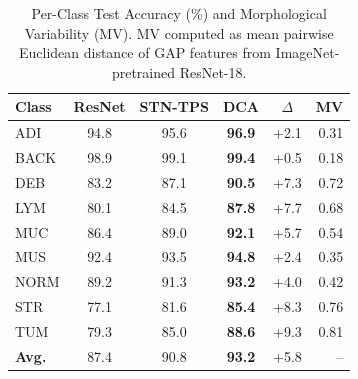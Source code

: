 \begin{table}[t]
\centering
\caption{Per-Class Test Accuracy (\%) and Morphological Variability (MV). MV computed as mean pairwise Euclidean distance of GAP features from ImageNet-pretrained ResNet-18.}
\label{tab:per_class}
\begin{tabularx}{\textwidth}{Xccccr}
\hline
\textbf{Class} & \textbf{ResNet} & \textbf{STN-TPS} & \textbf{DCA} & \textbf{$\Delta$} & \textbf{MV} \\
\hline
ADI & 94.8 & 95.6 & \textbf{96.9} & +2.1 & 0.31 \\
BACK & 98.9 & 99.1 & \textbf{99.4} & +0.5 & 0.18 \\
DEB & 83.2 & 87.1 & \textbf{90.5} & +7.3 & 0.72 \\
LYM & 80.1 & 84.5 & \textbf{87.8} & +7.7 & 0.68 \\
MUC & 86.4 & 89.0 & \textbf{92.1} & +5.7 & 0.54 \\
MUS & 92.4 & 93.5 & \textbf{94.8} & +2.4 & 0.35 \\
NORM & 89.2 & 91.3 & \textbf{93.2} & +4.0 & 0.42 \\
STR & 77.1 & 81.6 & \textbf{85.4} & +8.3 & 0.76 \\
TUM & 79.3 & 85.0 & \textbf{88.6} & +9.3 & 0.81 \\
\hline
\textbf{Avg.} & 87.4 & 90.8 & \textbf{93.2} & +5.8 & -- \\
\hline
\end{tabularx}
\end{table}